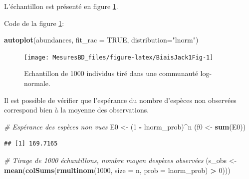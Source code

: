 \documentclass[
  11pt,
  american,
  a4paper,
  extrafontsizes,onecolumn,openright
  ]{memoir}
\newenvironment{Shaded}{\begin{snugshade}}{\end{snugshade}}
\newcommand{\AttributeTok}[1]{\textcolor[rgb]{0.13,0.29,0.53}{#1}}
\newcommand{\CommentTok}[1]{\textcolor[rgb]{0.56,0.35,0.01}{\textit{#1}}}
\newcommand{\ConstantTok}[1]{\textcolor[rgb]{0.56,0.35,0.01}{#1}}
\newcommand{\DecValTok}[1]{\textcolor[rgb]{0.00,0.00,0.81}{#1}}
\newcommand{\FunctionTok}[1]{\textcolor[rgb]{0.13,0.29,0.53}{\textbf{#1}}}
\newcommand{\NormalTok}[1]{#1}
\newcommand{\OtherTok}[1]{\textcolor[rgb]{0.56,0.35,0.01}{#1}}
\newcommand{\SpecialCharTok}[1]{\textcolor[rgb]{0.81,0.36,0.00}{\textbf{#1}}}
\newcommand{\StringTok}[1]{\textcolor[rgb]{0.31,0.60,0.02}{#1}}
\begin{document}
\normalsize

L'échantillon est présenté en figure \ref{fig:BiaisJack1Fig}.

Code de la figure \ref{fig:BiaisJack1Fig}:

\scriptsize

\begin{Shaded}
\begin{Highlighting}[]
\FunctionTok{autoplot}\NormalTok{(abundances, }\AttributeTok{fit\_rac =} \ConstantTok{TRUE}\NormalTok{, }\AttributeTok{distribution=}\StringTok{"lnorm"}\NormalTok{)}
\end{Highlighting}
\end{Shaded}

\normalsize

\scriptsize

\begin{figure}

{\centering \texttt{[image: MesuresBD\_files/figure-latex/BiaisJack1Fig-1]} 

}

\caption{Echantillon de 1000 individus tiré dans une communauté log-normale.}\label{fig:BiaisJack1Fig}
\end{figure}

\normalsize

Il est possible de vérifier que l'espérance du nombre d'espèces non observées correspond bien à la moyenne des observations.

\scriptsize

\begin{Shaded}
\begin{Highlighting}[]
\CommentTok{\# Espérance des espèces non vues}
\NormalTok{E0 }\OtherTok{\textless{}{-}}\NormalTok{ (}\DecValTok{1} \SpecialCharTok{{-}}\NormalTok{ lnorm\_prob)}\SpecialCharTok{\^{}}\NormalTok{n}
\NormalTok{(f0 }\OtherTok{\textless{}{-}} \FunctionTok{sum}\NormalTok{(E0))}
\end{Highlighting}
\end{Shaded}

\begin{verbatim}
## [1] 169.7165
\end{verbatim}

\begin{Shaded}
\begin{Highlighting}[]
\CommentTok{\# Tirage de 1000 échantillons, nombre moyen d\textquotesingle{}espèces observées}
\NormalTok{(s\_obs }\OtherTok{\textless{}{-}} \FunctionTok{mean}\NormalTok{(}\FunctionTok{colSums}\NormalTok{(}\FunctionTok{rmultinom}\NormalTok{(}\DecValTok{1000}\NormalTok{, }\AttributeTok{size =}\NormalTok{ n, }\AttributeTok{prob =}\NormalTok{ lnorm\_prob) }\SpecialCharTok{\textgreater{}} \DecValTok{0}\NormalTok{)))}
\end{Highlighting}
\end{Shaded}
\end{document}
